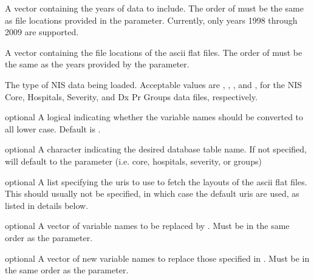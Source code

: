 \documentclass[a4paper]{book}
\begin{document}
%
\begin{Arguments}
\begin{ldescription}
\item[\code{years}] A vector containing the years of data to
include. The order of  must be the same as
file locations provided in the  parameter.
Currently, only years 1998 through 2009 are supported.

\item[\code{files}] A vector containing the file locations of
the ascii flat files.  The order of  must be
the same as the years provided by the 
parameter.

\item[\code{type}] The type of NIS data being loaded.
Acceptable values are , ,
, and , for the NIS Core,
Hospitals, Severity, and Dx Pr Groups data files,
respectively.

\item[\code{remove.capitalization}] optional A logical
indicating whether the variable names should be converted
to all lower case. Default is .

\item[\code{db.table}] optional A character indicating the
desired database table name. If not specified, will
default to the  parameter (i.e. core,
hospitals, severity, or groups)

\item[\code{layouts.uri}] optional A list specifying the uris to
use to fetch the layouts of the ascii flat files. This
should usually not be specified, in which case the
default uris are used, as listed in details below.

\item[\code{old}] optional A vector of variable names to be
replaced by . Must be in the same order as the
 parameter.

\item[\code{new}] optional A vector of new variable names to
replace those specified in . Must be in the
same order as the  parameter.
\end{ldescription}
\end{Arguments}
%
\end{document}
